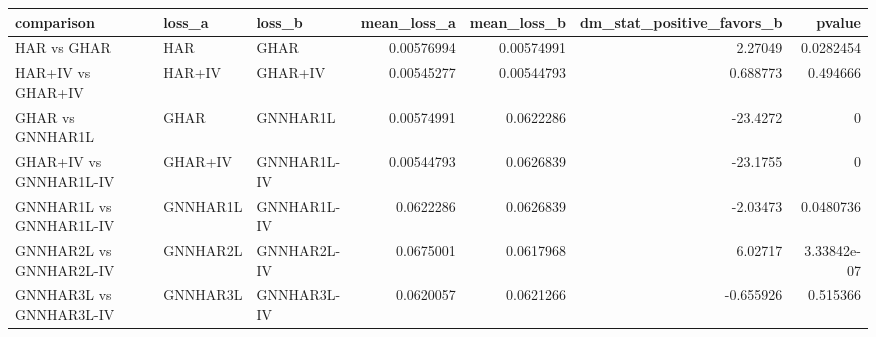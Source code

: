 \begin{tabular}{lllrrrr}
\toprule
comparison & loss_a & loss_b & mean_loss_a & mean_loss_b & dm_stat_positive_favors_b & pvalue \\
\midrule
HAR vs GHAR & HAR & GHAR & 0.00576994 & 0.00574991 & 2.27049 & 0.0282454 \\
HAR+IV vs GHAR+IV & HAR+IV & GHAR+IV & 0.00545277 & 0.00544793 & 0.688773 & 0.494666 \\
GHAR vs GNNHAR1L & GHAR & GNNHAR1L & 0.00574991 & 0.0622286 & -23.4272 & 0 \\
GHAR+IV vs GNNHAR1L-IV & GHAR+IV & GNNHAR1L-IV & 0.00544793 & 0.0626839 & -23.1755 & 0 \\
GNNHAR1L vs GNNHAR1L-IV & GNNHAR1L & GNNHAR1L-IV & 0.0622286 & 0.0626839 & -2.03473 & 0.0480736 \\
GNNHAR2L vs GNNHAR2L-IV & GNNHAR2L & GNNHAR2L-IV & 0.0675001 & 0.0617968 & 6.02717 & 3.33842e-07 \\
GNNHAR3L vs GNNHAR3L-IV & GNNHAR3L & GNNHAR3L-IV & 0.0620057 & 0.0621266 & -0.655926 & 0.515366 \\
\bottomrule
\end{tabular}
